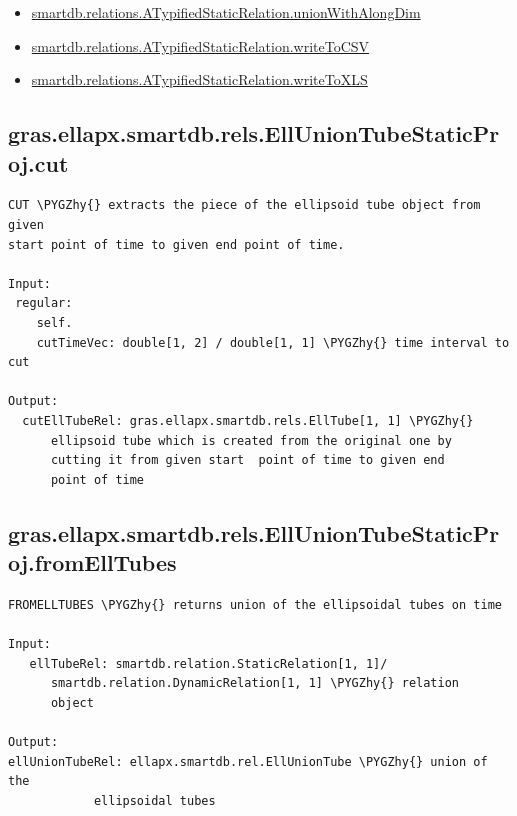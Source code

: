 \documentclass[letterpaper,10pt,english]{sphinxmanual}
\def\PYGZhy{\char`\-}
\begin{document}
\begin{itemize}
\item {} 
{\hyperref[chap_functions:smartdb-relations-atypifiedstaticrelation-unionwithalongdim]{smartdb.relations.ATypifiedStaticRelation.unionWithAlongDim}}

\item {} 
{\hyperref[chap_functions:smartdb-relations-atypifiedstaticrelation-writetocsv]{smartdb.relations.ATypifiedStaticRelation.writeToCSV}}

\item {} 
{\hyperref[chap_functions:smartdb-relations-atypifiedstaticrelation-writetoxls]{smartdb.relations.ATypifiedStaticRelation.writeToXLS}}

\end{itemize}


\subsection{gras.ellapx.smartdb.rels.EllUnionTubeStaticProj.cut}
\label{chap_functions:gras-ellapx-smartdb-rels-elluniontubestaticproj-cut}
\begin{Verbatim}[commandchars=\\\{\}]
CUT \PYGZhy{} extracts the piece of the ellipsoid tube object from given
start point of time to given end point of time.

Input:
 regular:
    self.
    cutTimeVec: double[1, 2] / double[1, 1] \PYGZhy{} time interval to cut

Output:
  cutEllTubeRel: gras.ellapx.smartdb.rels.EllTube[1, 1] \PYGZhy{}
      ellipsoid tube which is created from the original one by
      cutting it from given start  point of time to given end
      point of time
\end{Verbatim}


\subsection{gras.ellapx.smartdb.rels.EllUnionTubeStaticProj.fromEllTubes}
\label{chap_functions:gras-ellapx-smartdb-rels-elluniontubestaticproj-fromelltubes}
\begin{Verbatim}[commandchars=\\\{\}]
FROMELLTUBES \PYGZhy{} returns union of the ellipsoidal tubes on time

Input:
   ellTubeRel: smartdb.relation.StaticRelation[1, 1]/
      smartdb.relation.DynamicRelation[1, 1] \PYGZhy{} relation
      object

Output:
ellUnionTubeRel: ellapx.smartdb.rel.EllUnionTube \PYGZhy{} union of the
            ellipsoidal tubes
\end{Verbatim}
\end{document}
